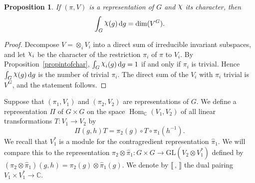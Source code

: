 \documentclass[12pt,reqno]{book}%
\newtheorem{proposition}{Proposition}[chapter]
\theoremstyle{definition}
\theoremstyle{remark}
\theoremstyle{theorem}
\theoremstyle{remark}
\newcommand{\mychi}{\raisebox{2pt}{$\chi$}}
\renewcommand{\d}{\dd}
\DeclareMathOperator{\Hom}{Hom}
\begin{document}
\begin{proposition}\label{propintofcharanddimoffixedpts}%
    If $(\pi, V)$ is a representation of $G$ and $\mychi$ its character, then
    \[
        \int_{G} \mychi(g) \, \d g = \dim(V^G).
    \]
\end{proposition}%
\begin{proof}%
    Decompose $V = \otimes_{i} V_i$ into a direct sum of irreducible invariant subspaces, and let $\mychi_i$ be the character of the restriction $\pi_i$ of $\pi$ to $V_i$.
    By Proposition~\ref{propintofchar}, $\int_{G} \mychi_i(g) \, \d g = 1$ if and only if $\pi_i$ is trivial.
    Hence $\int_{G} \mychi(g) \, \d g$ is the number of trivial $\pi_i$.
    The direct sum of the $V_i$ with $\pi_i$ trivial is $V^G$, and the statement follows.
\end{proof}%

Suppose that $(\pi_1, V_1)$ and $(\pi_2, V_2)$ are representations of $G$.
We define a representation $\varPi$ of $G \times G$ on the space $\Hom_\mathbb{C}(V_1, V_2)$ of all linear transformations $T : V_1 \to V_2$ by
\begin{equation}\label{eqprodofrepnonG}
    \varPi(g, h)T = \pi_2(g) \circ T \circ \pi_1(h^{-1}).
\end{equation}
We recall that $V_1^*$ is a module for the contragredient representation $\widehat{\pi}_1$.
We will compare this to the representation $\pi_2 \otimes \widehat{\pi}_1 : G \times G \to \mathrm{GL}(V_2 \otimes V_1^*)$ defined by $(\pi_2 \otimes \widehat{\pi}_1)(g, h) = \pi_2(g) \otimes \widehat{\pi}_1(g)$.
We denote by $\llbracket \, , \, \rrbracket$ the dual pairing $V_1 \times V_1^* \to \mathbb{C}$.
\end{document}
